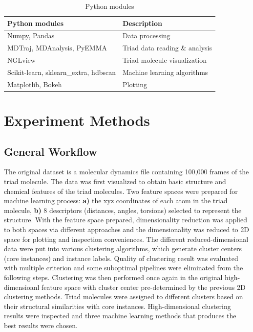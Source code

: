 \documentclass[a4paper]{article}
\begin{document}
\begin{table}[H]
    \centering
    \caption{Python modules}
    \begin{tabular}{l|l}
    \hline \hline
        \textbf{Python modules} & \textbf{Description} \\
        \hline
        Numpy, Pandas & Data processing \\
        MDTraj\cite{MDTraj}, MDAnalysis\cite{MDAnalysis_1}\cite{MDAnalysis_2}, PyEMMA \cite{pyemma}     & Triad data reading \& analysis \\
        NGLview\cite{NGLview} & Triad molecule visualization \\
        Scikit-learn\cite{scikit-learn}, sklearn\_extra, hdbscan\cite{hdbscan} & Machine learning algorithms \\
        Matplotlib, Bokeh & Plotting \\
        \hline \hline
    \end{tabular}
    \label{table: python modules}
\end{table}

\section{Experiment Methods}

\subsection{General Workflow}
The original dataset is a molecular dynamics file containing 100,000 frames of the triad molecule. The data was first visualized to obtain basic structure and chemical features of the triad molecules. Two feature spaces were prepared for machine learning process: \textbf{a)} the xyz coordinates of each atom in the triad molecule, \textbf{b)} 8 descriptors (distances, angles, torsions) selected to represent the structure. With the feature space prepared, dimensionality reduction was applied to both spaces via different approaches and the dimensionality was reduced to 2D space for plotting and inspection conveniences. The different reduced-dimensional data were put into various clustering algorithms, which generate cluster centers (core instances) and instance labels. Quality of clustering result was evaluated with multiple criterion and some suboptimal pipelines were eliminated from the following steps. Clustering was then performed once again in the original high-dimensioanl feature space with cluster center pre-determined by the previous 2D clustering methods. Triad molecules were assigned to different clusters based on their structural similarities with core instances. High-dimensional clustering results were inspected and three machine learning methods that produces the best results were chosen.
\end{document}
